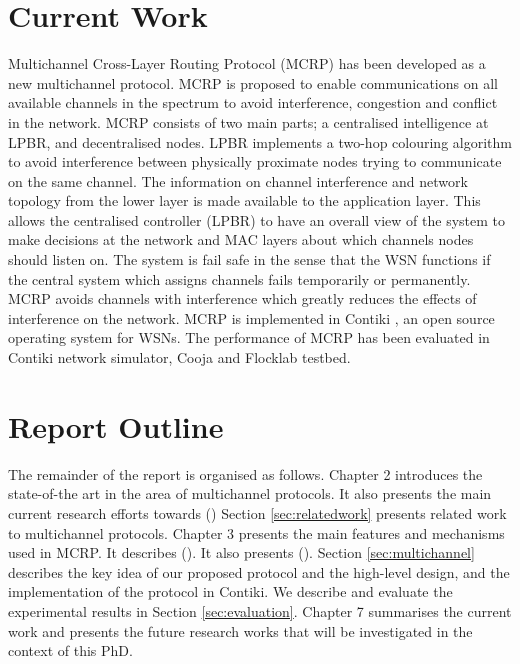 \section{Current Work}
Multichannel Cross-Layer Routing Protocol (MCRP) has been developed as a new multichannel protocol. MCRP is proposed to enable communications on all available channels in the spectrum to avoid interference, congestion and conflict in the network. MCRP consists of two main parts; a centralised intelligence at LPBR, and decentralised nodes. LPBR implements a two-hop colouring algorithm to avoid interference between physically proximate nodes trying to communicate on the same channel. The information on channel interference and network topology from the lower layer is made available to the application layer. This allows the centralised controller (LPBR) to have an overall view of the system to make decisions at the network and MAC layers about which channels nodes should listen on. The system is fail safe in the sense that the WSN functions if the central system which assigns channels fails temporarily or permanently. MCRP avoids channels with interference which greatly reduces the effects of interference on the network. MCRP is implemented in Contiki \cite{contiki}, an open source operating system for WSNs. The performance of MCRP has been evaluated in Contiki network simulator, Cooja \cite{cooja} and Flocklab \cite{flocklab} testbed.



\section{Report Outline}
The remainder of the report is organised as follows. Chapter 2 introduces the state-of-the art in the area of multichannel protocols. It also presents the main current research efforts towards () Section \ref{sec:relatedwork} presents related work to multichannel protocols. Chapter 3 presents the main features and mechanisms used in MCRP. It describes (). It also presents (). Section \ref{sec:multichannel} describes the key idea of our proposed protocol and the high-level design, and the implementation of the protocol in Contiki. We describe and evaluate the experimental results in Section \ref{sec:evaluation}. Chapter 7 summarises the current work and presents the future research works that will be investigated in the context of this PhD.